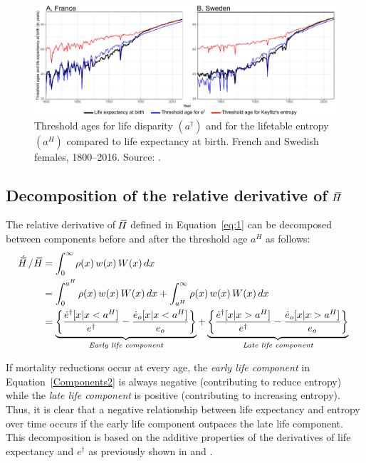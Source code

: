 \documentclass[a4paper,twoside, openright, 12pt, leqno]{article}
\newcommand*\xbar[1]{%
   \hbox{%
     \vbox{%
       \hrule height 0.5pt %
       \kern0.3ex%
       \hbox{%
         \kern-0.28em%
         \ensuremath{#1}%
         \kern-0.05em%
       }%
     }%
   }%
}
\begin{document}
\begin{figure}[h]
  \centering
  \includegraphics[scale=.72]{Figures/Threshold_ages}
  \caption{Threshold ages for life disparity $(a^\dagger)$ and for the lifetable entropy $(a^H)$ compared to life expectancy at birth. French and Swedish females, 1800--2016. Source: \cite{HMD}.}
  \label{fig:Fig2}
\end{figure}

\FloatBarrier

\subsection{Decomposition of the relative derivative of $\,\xbar{H}$}

The relative derivative of $\,\xbar{H}$ defined in Equation~\eqref{eq:1} can be decomposed between components before and after the threshold age $a^H$ as follows:
%
\begin{equation}
 \begin{split}
 \dot{\xbar{H}}\,/\,\,\xbar{H} &= \int_0^\infty\rho(x)\,w(x)\,W(x)\,dx\;\\
  & = \int_0^{a^H} \rho(x)\,w(x)\,W(x)\,dx + \int_{a^H}^\infty\rho(x)\,w(x)\,W(x)\,dx		 \\
		& = \underbrace{ \left\lbrace \frac{\dot{e}^\dagger[x|x < a^H]}{e^\dagger}- \frac{\dot{e}_o[x|x < a^H]}{e_o}  \right\rbrace }_{\textit{Early life component}} + \underbrace{\left\lbrace \frac{\dot{e}^\dagger[x|x > a^H]}{e^\dagger}-\frac{\dot{e}_o[x|x > a^H]}{e_o} \right\rbrace }_{\textit{Late life component}}
 \end{split}
 \label{Components2}
\end{equation}

If mortality reductions occur at every age, the \textit{early life component} in Equation~\eqref{Components2} is always negative (contributing to reduce entropy) while the \textit{late life component} is positive (contributing to increasing entropy). Thus, it is clear that a negative relationship between life expectancy and entropy over time occurs if the early life component outpaces the late life component. This decomposition is based on the additive properties of the derivatives of life expectancy and $e^\dagger$ as previously shown in \citet{Vaupel2003} and \citet{Fernandez2015}. 
\end{document}
